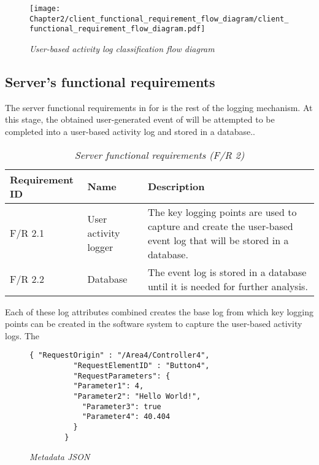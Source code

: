 \begin{figure}[!htb] %
	\centering %
	\texttt{[image: Chapter2/client\_functional\_requirement\_flow\_diagram/client\_functional\_requirement\_flow\_diagram.pdf]}
	\caption[User-based activity log classification flow diagram]
	{\textit{User-based activity log classification flow diagram}}\label{fig:ch2_user_based_actvity_classification}
\end{figure}

\clearpage

\subsection{Server's functional requirements}
The server functional requirements in  for  is the rest of the logging mechanism. At this stage, the obtained user-generated event of  will be attempted to be completed into a user-based activity log and stored in a database.. 

\begin{table}[!htb]
	\centering
	\small
	\caption[Server functional requirements]
	{\textit{Server functional requirements (F/R 2)}}
	\label{tbl:Ch2_Server_Functional_Requirements}
	\begin{tabularx}{\textwidth}{|l|l|X|}
		\hline \textbf{Requirement ID} & \textbf{Name} & \textbf{Description} \\
		\hline F/R 2.1 & User activity logger & The key logging points are used to capture and create the user-based event log that will be stored in a database.\\
		\hline F/R 2.2 & Database & The event log is stored in a database until it is needed for further analysis.\\
		\hline
	\end{tabularx}
\end{table}

Each of these log attributes combined creates the base log from which key logging points can be created in the software system to capture the user-based activity logs. The 

\begin{figure}[!htb]
	\centering
	\begin{lstlisting}[style=json] 
		{ "RequestOrigin" : "/Area4/Controller4",
		  "RequestElementID" : "Button4",
		  "RequestParameters": {
		  "Parameter1": 4,
		  "Parameter2": "Hello World!",
			"Parameter3": true
			"Parameter4": 40.404
		  }		
		}
	\end{lstlisting}
	\caption[Metadata JSON]
	{\textit{Metadata JSON}}\label{fig:Ch2_Metadata_Json_Example}
\end{figure}


